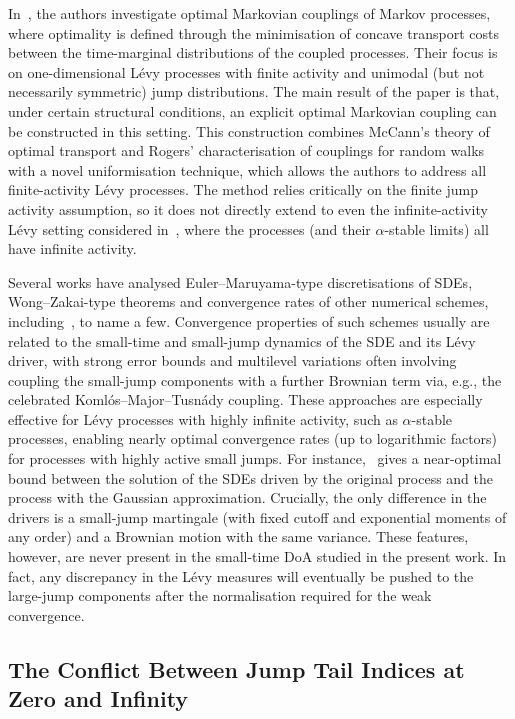 \documentclass[en,oneside,bbfont,article]{amsart}
\theoremstyle{remark}
\theoremstyle{definition}
\theoremstyle{definition}
\newcommand\1{\mathds{1}}
\begin{document}
In~\cite{MR4779850}, the authors investigate optimal Markovian couplings of Markov processes, where optimality is defined through the minimisation of concave transport costs between the time-marginal distributions of the coupled processes. Their focus is on one-dimensional L\'evy processes with finite activity and unimodal (but not necessarily symmetric) jump distributions. The main result of the paper is that, under certain structural conditions, an explicit optimal Markovian coupling can be constructed in this setting. This construction combines McCann’s theory of optimal transport and Rogers’ characterisation of couplings for random walks with a novel uniformisation technique, which allows the authors to address all finite-activity L\'evy processes. The method relies critically on the finite jump activity assumption, so it does not directly extend to even the infinite-activity L\'evy setting considered in~\cite{WassersteinPaper}, where the processes (and their $\alpha$-stable limits) all have infinite activity.

Several works have analysed Euler--Maruyama-type discretisations of SDEs, Wong--Zakai-type theorems and convergence rates of other numerical schemes, including~\cite{MR2759203,MR2802466,pavlyukevich2025stronguniformwongzakaiapproximations,kosenkova2020orderconvergenceweakwongzakai}, to name a few. Convergence properties of such schemes usually are related to the small-time and small-jump dynamics of the SDE and its L\'evy driver, with strong error bounds and multilevel variations often involving coupling the small-jump components with a further Brownian term via, e.g., the celebrated Koml\'os--Major--Tusn\'ady coupling. These approaches are especially effective for L\'evy processes with highly infinite activity, such as $\alpha$-stable processes, enabling nearly optimal convergence rates (up to logarithmic factors) for processes with highly active small jumps. For instance,~\cite[Thm~3.1]{MR2759203} gives a near-optimal bound between the solution of the SDEs driven by the original process and the process with the Gaussian approximation. Crucially, the only difference in the drivers is a small-jump martingale (with fixed cutoff and exponential moments of any order) and a Brownian motion with the same variance. These features, however, are never present in the small-time DoA studied in the present work. In fact, any discrepancy in the L\'evy measures will eventually be pushed to the large-jump components after the normalisation required for the weak convergence.


\subsection{The Conflict Between Jump Tail Indices at Zero and Infinity}
\label{sec:failed_ideas}
\end{document}
